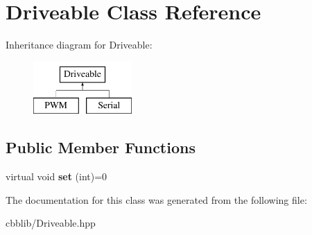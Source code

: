 \hypertarget{classDriveable}{\section{\-Driveable \-Class \-Reference}
\label{classDriveable}
}
\-Inheritance diagram for \-Driveable\-:\begin{figure}[H]
\begin{center}
\leavevmode
\includegraphics[height=2.000000cm]{classDriveable}
\end{center}
\end{figure}
\subsection*{\-Public \-Member \-Functions}
\begin{DoxyCompactItemize}
\item 
\hypertarget{classDriveable_a981755c32f5576042fe2ffd51489dcca}{virtual void {\bfseries set} (int)=0}\label{classDriveable_a981755c32f5576042fe2ffd51489dcca}

\end{DoxyCompactItemize}


\-The documentation for this class was generated from the following file\-:\begin{DoxyCompactItemize}
\item 
cbblib/\-Driveable.\-hpp\end{DoxyCompactItemize}

